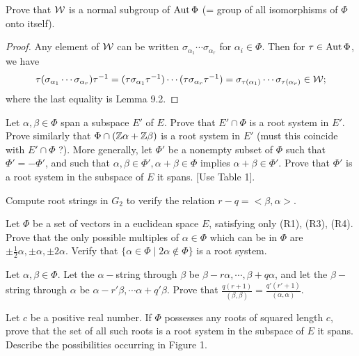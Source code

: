 \begin{ex}
  Prove that ${\cal W}$ is a normal subgroup of $\operatorname{Aut}\Phi$ (= group of all isomorphisms of $\Phi$ onto itself).
\end{ex}
\begin{proof}
  Any element of ${\cal W}$ can be written $\sigma_{\alpha_1}\cdots\sigma_{\alpha_r}$ for $\alpha_i\in\Phi$. Then for $\tau\in\operatorname{Aut}\Phi$, we have
  \begin{equation*}
    \tau(\sigma_{\alpha_1}\cdots\sigma_{\alpha_r})\tau^{-1} = (\tau\sigma_{\alpha_1}\tau^{-1})\cdots(\tau\sigma_{\alpha_r}\tau^{-1}) =\sigma_{\tau(\alpha_1)}\cdots\sigma_{\tau(\alpha_r)} \in{\cal W} ;
  \end{equation*}
  where the last equality is Lemma 9.2.
\end{proof}

\begin{ex}\label{9.7}
  Let $\alpha,\beta\in\Phi$ span a subspace $E'$ of $E$. Prove that $E'\cap\Phi$ is a root system in $E'$. Prove similarly that $\Phi\cap({\mathbb Z}\alpha+{\mathbb Z}\beta)$ is a root system in $E'$ (must this coincide with $E'\cap \Phi$ ?). More generally, let $\Phi'$ be a nonempty subset of $\Phi$ such that $\Phi'=-\Phi'$, and such that $\alpha,\beta\in\Phi', \alpha+\beta\in\Phi$ implies $\alpha+\beta\in\Phi'$. Prove that $\Phi'$ is a root system in the subspace of $E$ it spans. [Use Table 1].
\end{ex}

\begin{ex}
  Compute root strings in $G_2$ to verify the relation $r - q =< \beta,\alpha >$.
\end{ex}

\begin{ex}\label{9.9}
  Let $\Phi$ be a set of vectors in a euclidean space $E$, satisfying only (R1), (R3), (R4). Prove that the only possible multiples of $\alpha\in\Phi$ which can be in $\Phi$ are $\pm\frac{1}{2}\alpha,\pm\alpha,\pm2\alpha$. Verify that $\{\alpha\in\Phi\mid 2\alpha\notin \Phi\}$ is a root system.
\end{ex}

\begin{ex}
  Let $\alpha,\beta\in\Phi$. Let the $\alpha-$string through $\beta$ be $\beta-r\alpha,\cdots,\beta+q\alpha$, and let the $\beta-$string through $\alpha$ be $\alpha-r'\beta,\cdots\alpha+q'\beta$. Prove that $\frac{q(r+1)}{(\beta,\beta)} = \frac{q'(r'+1)}{(\alpha,\alpha)}$.
\end{ex}

\begin{ex}
  Let $c$ be a positive real number. If $\Phi$ possesses any roots of squared length $c$, prove that the set of all such roots is a root system in the subspace of $E$ it spans. Describe the possibilities occurring in Figure 1.
\end{ex}

